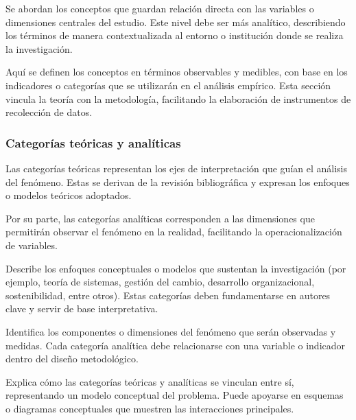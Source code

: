 
Se abordan los conceptos que guardan relación directa con las variables o dimensiones centrales del estudio. Este nivel debe ser más analítico, describiendo los términos de manera contextualizada al entorno o institución donde se realiza la investigación.


Aquí se definen los conceptos en términos observables y medibles, con base en los indicadores o categorías que se utilizarán en el análisis empírico. Esta sección vincula la teoría con la metodología, facilitando la elaboración de instrumentos de recolección de datos.

\subsubsection{Categorías teóricas y analíticas}

Las categorías teóricas representan los ejes de interpretación que guían el análisis del fenómeno. Estas se derivan de la revisión bibliográfica y expresan los enfoques o modelos teóricos adoptados.

Por su parte, las categorías analíticas corresponden a las dimensiones que permitirán observar el fenómeno en la realidad, facilitando la operacionalización de variables.


Describe los enfoques conceptuales o modelos que sustentan la investigación (por ejemplo, teoría de sistemas, gestión del cambio, desarrollo organizacional, sostenibilidad, entre otros). Estas categorías deben fundamentarse en autores clave y servir de base interpretativa.


Identifica los componentes o dimensiones del fenómeno que serán observadas y medidas. Cada categoría analítica debe relacionarse con una variable o indicador dentro del diseño metodológico.


Explica cómo las categorías teóricas y analíticas se vinculan entre sí, representando un modelo conceptual del problema. Puede apoyarse en esquemas o diagramas conceptuales que muestren las interacciones principales.

